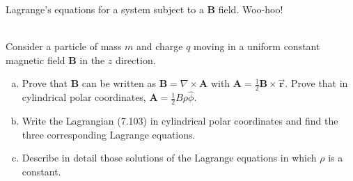 \documentclass[11pt,letterpaper,boxed]{../hmcpsetrhino}
\newcommand{\half}{\frac{1}{2}}
\let\oldvec\vec
\renewcommand{\vec}[1]{\oldvec{\mathbf{#1}}}
\begin{document}
\begin{solution}

\vfill
\end{solution}


\newpage

\begin{problem}[iv]
Lagrange's equations for a system subject to a $\mathbf{B}$ field. Woo-hoo!\\
\hfill\\
\begin{problem}[7.49]
Consider a particle of mass $m$ and charge $q$ moving in a uniform constant magnetic field $\mathbf{B}$ in the $z$ direction. 
\begin{enumerate}[(a)]
\item Prove that $\mathbf{B}$ can be written as $\mathbf{B} = \nabla \times \mathbf{A}$ with $\mathbf{A} = \half \mathbf{B} \times \vec r$. Prove that in cylindrical polar coordinates, $\mathbf{A} = \half B \rho \hat \phi$. 
\item Write the Lagrangian (7.103) in cylindrical polar coordinates and find the three corresponding Lagrange equations. 
\item Describe in detail those solutions of the Lagrange equations in which $\rho$ is a constant.

\end{enumerate}
\end{problem}
\vspace{-0.45cm}
\end{problem}

\begin{solution}

\vfill
\end{solution}
\end{document}
